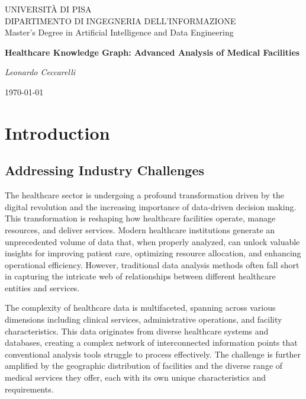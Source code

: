 \documentclass[12pt,a4paper]{report}
\begin{document}
\begin{titlepage}
    \centering
    \vspace*{2cm}
    
    {\Large UNIVERSITÀ DI PISA}\\
    \vspace{0.5cm}
    {\large DIPARTIMENTO DI INGEGNERIA DELL'INFORMAZIONE}\\
    \vspace{0.5cm}
    {\large Master's Degree in Artificial Intelligence and Data Engineering}\\
    
    \vspace{3cm}
    
    {\Huge\bfseries Healthcare Knowledge Graph: Advanced Analysis of Medical Facilities}\\
    
    \vspace{2cm}
    
    {\Large\itshape Leonardo Ceccarelli}\\
    
    \vfill
    
    {\large \today}
\end{titlepage}

\tableofcontents

\chapter{Introduction}
\section{Addressing Industry Challenges}
The healthcare sector is undergoing a profound transformation driven by the digital revolution and the increasing importance of data-driven decision making. This transformation is reshaping how healthcare facilities operate, manage resources, and deliver services. Modern healthcare institutions generate an unprecedented volume of data that, when properly analyzed, can unlock valuable insights for improving patient care, optimizing resource allocation, and enhancing operational efficiency. However, traditional data analysis methods often fall short in capturing the intricate web of relationships between different healthcare entities and services.

The complexity of healthcare data is multifaceted, spanning across various dimensions including clinical services, administrative operations, and facility characteristics. This data originates from diverse healthcare systems and databases, creating a complex network of interconnected information points that conventional analysis tools struggle to process effectively. The challenge is further amplified by the geographic distribution of facilities and the diverse range of medical services they offer, each with its own unique characteristics and requirements.
\end{document}
